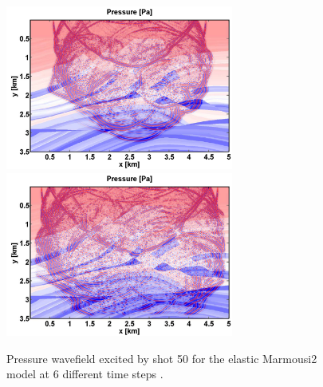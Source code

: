 \begin{figure}
\begin{center}
\includegraphics[width=7.5cm]{figures/marmousi/shot93_snap_14.pdf}\includegraphics[width=7.5cm]{figures/marmousi/shot93_snap_16.pdf}\\ 
\caption{Pressure wavefield excited by shot 50 for the elastic Marmousi2 model at 6 different time steps .}
\label{wavefield_marmousi_true}
\end{center}
\end{figure}
\clearpage
